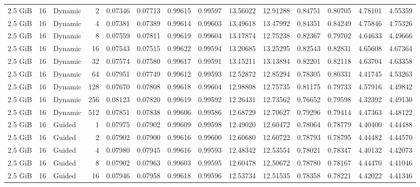 \begin{table}[H]
\begin{adjustbox}{width=\textwidth, keepaspectratio}
\begin{tabular}{rrlrrrrrrrrrrr}
                    2.5 GiB & 16 & Dynamic & 2 & 0.07346 & 0.07713 & 0.99615 & 0.99597 & 13.56022 & 12.91288 & 0.84751 & 0.80705 & 4.78101 & 4.55359 \\
                    2.5 GiB & 16 & Dynamic & 4 & 0.07381 & 0.07389 & 0.99614 & 0.99603 & 13.49618 & 13.47992 & 0.84351 & 0.84249 & 4.75846 & 4.75326 \\
                    2.5 GiB & 16 & Dynamic & 8 & 0.07559 & 0.07811 & 0.99619 & 0.99604 & 13.17874 & 12.75238 & 0.82367 & 0.79702 & 4.64633 & 4.49666 \\
                    2.5 GiB & 16 & Dynamic & 16 & 0.07543 & 0.07515 & 0.99622 & 0.99594 & 13.20685 & 13.25295 & 0.82543 & 0.82831 & 4.65608 & 4.67364 \\
                    2.5 GiB & 16 & Dynamic & 32 & 0.07574 & 0.07580 & 0.99617 & 0.99591 & 13.15211 & 13.13894 & 0.82201 & 0.82118 & 4.63704 & 4.63358 \\
                    2.5 GiB & 16 & Dynamic & 64 & 0.07951 & 0.07749 & 0.99612 & 0.99593 & 12.52872 & 12.85294 & 0.78305 & 0.80331 & 4.41745 & 4.53263 \\
                    2.5 GiB & 16 & Dynamic & 128 & 0.07670 & 0.07808 & 0.99618 & 0.99604 & 12.98808 & 12.75735 & 0.81175 & 0.79733 & 4.57916 & 4.49842 \\
                    2.5 GiB & 16 & Dynamic & 256 & 0.08123 & 0.07820 & 0.99619 & 0.99592 & 12.26431 & 12.73562 & 0.76652 & 0.79598 & 4.32392 & 4.49130 \\
                    2.5 GiB & 16 & Dynamic & 512 & 0.07851 & 0.07838 & 0.99606 & 0.99586 & 12.68729 & 12.70627 & 0.79296 & 0.79414 & 4.47363 & 4.48122 \\
                    2.5 GiB & 16 & Guided & 1 & 0.07975 & 0.07902 & 0.99609 & 0.99598 & 12.49020 & 12.60472 & 0.78064 & 0.78779 & 4.40400 & 4.44488 \\
                    2.5 GiB & 16 & Guided & 2 & 0.07902 & 0.07900 & 0.99616 & 0.99600 & 12.60680 & 12.60722 & 0.78793 & 0.78795 & 4.44482 & 4.44570 \\
                    2.5 GiB & 16 & Guided & 4 & 0.07980 & 0.07945 & 0.99616 & 0.99593 & 12.48342 & 12.53554 & 0.78021 & 0.78347 & 4.40132 & 4.42073 \\
                    2.5 GiB & 16 & Guided & 8 & 0.07902 & 0.07963 & 0.99603 & 0.99595 & 12.60478 & 12.50672 & 0.78780 & 0.78167 & 4.44470 & 4.41046 \\
                    2.5 GiB & 16 & Guided & 16 & 0.07946 & 0.07958 & 0.99618 & 0.99596 & 12.53734 & 12.51535 & 0.78358 & 0.78221 & 4.42022 & 4.41346 \\

\end{tabular}
\end{adjustbox}
\end{table}
